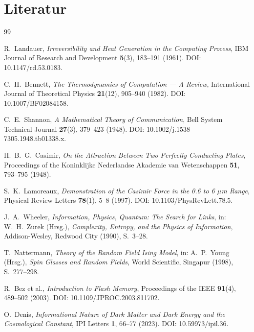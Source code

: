\section*{Literatur}

\begin{thebibliography}{99}

R.~Landauer,
\textit{Irreversibility and Heat Generation in the Computing Process},
IBM Journal of Research and Development \textbf{5}(3), 183--191 (1961).
DOI: 10.1147/rd.53.0183.

C.~H.~Bennett,
\textit{The Thermodynamics of Computation — A Review},
International Journal of Theoretical Physics \textbf{21}(12), 905--940 (1982).
DOI: 10.1007/BF02084158.

C.~E.~Shannon,
\textit{A Mathematical Theory of Communication},
Bell System Technical Journal \textbf{27}(3), 379--423 (1948).
DOI: 10.1002/j.1538-7305.1948.tb01338.x.

H.~B.~G.~Casimir,
\textit{On the Attraction Between Two Perfectly Conducting Plates},
Proceedings of the Koninklijke Nederlandse Akademie van Wetenschappen
\textbf{51}, 793--795 (1948).

S.~K.~Lamoreaux,
\textit{Demonstration of the Casimir Force in the 0.6 to 6 $\mu$m Range},
Physical Review Letters \textbf{78}(1), 5--8 (1997).
DOI: 10.1103/PhysRevLett.78.5.

J.~A.~Wheeler,
\textit{Information, Physics, Quantum: The Search for Links},
in: W.~H.~Zurek (Hrsg.), \textit{Complexity, Entropy, and the Physics of
Information}, Addison-Wesley, Redwood City (1990), S.~3--28.

T.~Nattermann,
\textit{Theory of the Random Field Ising Model},
in: A.~P.~Young (Hrsg.), \textit{Spin Glasses and Random Fields},
World Scientific, Singapur (1998), S.~277--298.

R.~Bez et al.,
\textit{Introduction to Flash Memory},
Proceedings of the IEEE \textbf{91}(4), 489--502 (2003).
DOI: 10.1109/JPROC.2003.811702.

O.~Denis,
\textit{Informational Nature of Dark Matter and Dark Energy and the
Cosmological Constant},
IPI Letters \textbf{1}, 66--77 (2023).
DOI: 10.59973/ipil.36.


\end{thebibliography}
